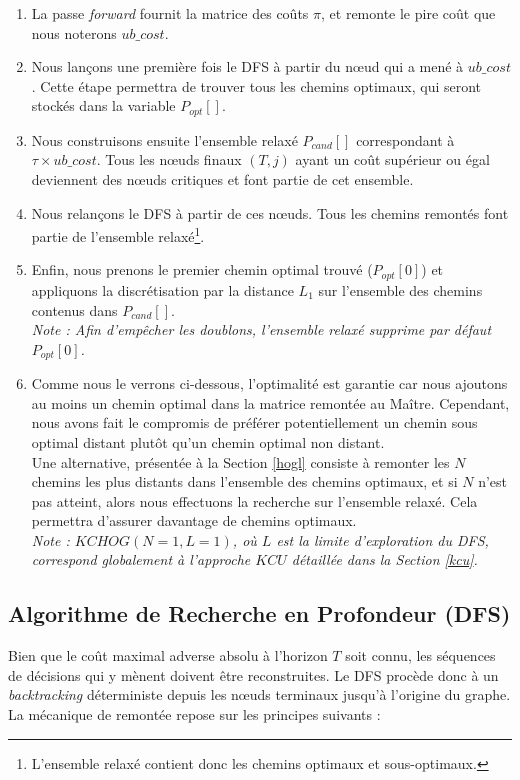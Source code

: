 \documentclass[11pt,a4paper]{article}
\begin{document}
\begin{enumerate}
    \item La passe \textit{forward} fournit la matrice des coûts $\pi$, et remonte le pire coût que nous noterons $ub\_cost$.
    \item Nous lançons une première fois le DFS à partir du nœud qui a mené à $ub\_cost$. Cette étape permettra de trouver tous les chemins optimaux, qui seront stockés dans la variable $P_{opt}[]$.
    \item Nous construisons ensuite l'ensemble relaxé $P_{cand}[]$ correspondant à $\tau \times ub\_cost$. Tous les nœuds finaux $(T, j)$ ayant un coût supérieur ou égal deviennent des nœuds critiques et font partie de cet ensemble.
    \item Nous relançons le DFS à partir de ces nœuds. Tous les chemins remontés font partie de l'ensemble relaxé\footnote{L'ensemble relaxé contient donc les chemins optimaux et sous-optimaux.}.
    \item Enfin, nous prenons le premier chemin optimal trouvé ($P_{opt}[0]$) et appliquons la discrétisation par la distance $L_1$ sur l'ensemble des chemins contenus dans $P_{cand}[]$.\\
    \textit{Note : Afin d’empêcher les doublons, l'ensemble relaxé supprime par défaut $P_{opt}[0]$.}
    \item Comme nous le verrons ci-dessous, l'optimalité est garantie car nous ajoutons au moins un chemin optimal dans la matrice remontée au Maître. Cependant, nous avons fait le compromis de préférer potentiellement un chemin sous optimal distant plutôt qu'un chemin optimal non distant.\\
    Une alternative, présentée à la Section \ref{hogl} consiste à remonter les  $N$ chemins les plus distants dans l'ensemble des chemins optimaux, et si $N$ n'est pas atteint, alors nous effectuons la recherche sur l'ensemble relaxé. Cela permettra d'assurer davantage de chemins optimaux.\\
    \textit{Note : $KCHOG(N=1, L=1)$, où $L$ est la limite d'exploration du DFS, correspond globalement à l'approche $KCU$ détaillée dans la Section \ref{kcu}.}
\end{enumerate}

\subsection{Algorithme de Recherche en Profondeur (DFS)}
\label{algo_dfs}

Bien que le coût maximal adverse absolu à l'horizon $T$ soit connu, les séquences de décisions qui y mènent doivent être reconstruites. Le DFS procède donc à un \textit{backtracking} déterministe depuis les nœuds terminaux jusqu'à l'origine du graphe. La mécanique de remontée repose sur les principes suivants :
\end{document}
